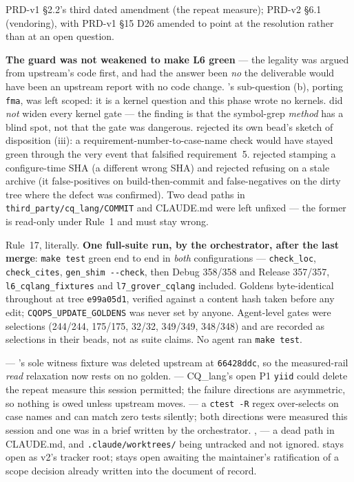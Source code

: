
PRD-v1 \S2.2's third dated amendment (the repeat measure); PRD-v2 \S6.1 (vendoring), with
PRD-v1 \S15 D26 amended to point at the resolution rather than at an open question.

\textbf{The guard was not weakened to make L6 green} --- the legality was argued from
upstream's code first, and had the answer been \emph{no} the deliverable would have been an
upstream report with no code change. 's sub-question (b), porting \texttt{fma}, was
left scoped: it is a kernel question and this phase wrote no kernels.  did
\emph{not} widen every kernel gate --- the finding is that the symbol-grep \emph{method} has a
blind spot, not that the gate was dangerous.  rejected its own bead's sketch of
disposition (iii): a requirement-number-to-case-name check would have stayed green through the
very event that falsified requirement~5.  rejected stamping a configure-time SHA
(a different wrong SHA) and rejected refusing on a stale archive (it false-positives on
build-then-commit and false-negatives on the dirty tree where the defect was confirmed). Two
dead paths in \texttt{third\_party/cq\_lang/COMMIT} and CLAUDE.md were left unfixed --- the
former is read-only under Rule~1 and must stay wrong.

Rule~17, literally. \textbf{One full-suite run, by the orchestrator, after the last merge}:
\texttt{make test} green end to end in \emph{both} configurations --- \texttt{check\_loc},
\texttt{check\_cites}, \texttt{gen\_shim -{}-check}, then Debug 358/358 and Release 357/357,
\texttt{l6\_cqlang\_fixtures} and \texttt{l7\_grover\_cqlang} included. Goldens byte-identical
throughout at tree \texttt{e99a05d1}, verified against a content hash taken before any edit;
\texttt{CQOPS\_UPDATE\_GOLDENS} was never set by anyone. Agent-level gates were selections
(244/244, 175/175, 32/32, 349/349, 348/348) and are recorded as selections in their beads, not
as suite claims. No agent ran \texttt{make test}.

 --- 's sole witness fixture was deleted upstream at \texttt{66428ddc}, so
the measured-rail \emph{read} relaxation now rests on no golden.  --- CQ\_lang's open
P1 \texttt{yiid} could delete the repeat measure this session permitted; the failure directions
are asymmetric, so nothing is owed unless upstream moves.  --- a \texttt{ctest -R}
regex over-selects on case names and can match zero tests silently; both directions were
measured this session and one was in a brief written by the orchestrator. ,
 --- a dead path in CLAUDE.md, and \texttt{.claude/worktrees/} being untracked and
not ignored.  stays open as v2's tracker root;  stays open awaiting the
maintainer's ratification of a scope decision already written into the document of record.
